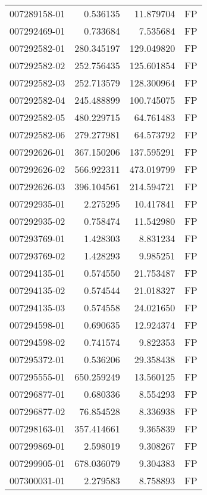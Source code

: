 \begin{tabular}{lrrl}
007289158-01 &    0.536135 &      11.879704 &   FP \\
007292469-01 &    0.733684 &       7.535684 &   FP \\
007292582-01 &  280.345197 &     129.049820 &   FP \\
007292582-02 &  252.756435 &     125.601854 &   FP \\
007292582-03 &  252.713579 &     128.300964 &   FP \\
007292582-04 &  245.488899 &     100.745075 &   FP \\
007292582-05 &  480.229715 &      64.761483 &   FP \\
007292582-06 &  279.277981 &      64.573792 &   FP \\
007292626-01 &  367.150206 &     137.595291 &   FP \\
007292626-02 &  566.922311 &     473.019799 &   FP \\
007292626-03 &  396.104561 &     214.594721 &   FP \\
007292935-01 &    2.275295 &      10.417841 &   FP \\
007292935-02 &    0.758474 &      11.542980 &   FP \\
007293769-01 &    1.428303 &       8.831234 &   FP \\
007293769-02 &    1.428293 &       9.985251 &   FP \\
007294135-01 &    0.574550 &      21.753487 &   FP \\
007294135-02 &    0.574544 &      21.018327 &   FP \\
007294135-03 &    0.574558 &      24.021650 &   FP \\
007294598-01 &    0.690635 &      12.924374 &   FP \\
007294598-02 &    0.741574 &       9.822353 &   FP \\
007295372-01 &    0.536206 &      29.358438 &   FP \\
007295555-01 &  650.259249 &      13.560125 &   FP \\
007296877-01 &    0.680336 &       8.554293 &   FP \\
007296877-02 &   76.854528 &       8.336938 &   FP \\
007298163-01 &  357.414661 &       9.365839 &   FP \\
007299869-01 &    2.598019 &       9.308267 &   FP \\
007299905-01 &  678.036079 &       9.304383 &   FP \\
007300031-01 &    2.279583 &       8.758893 &   FP \\

\end{tabular}
